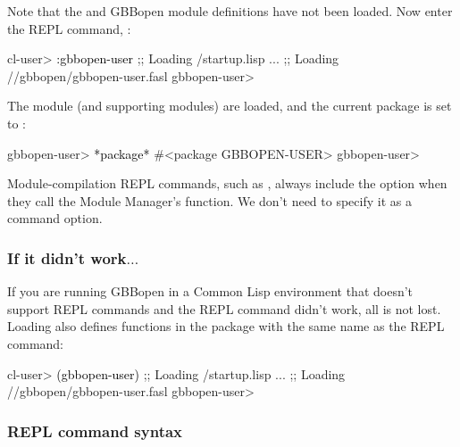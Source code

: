 \documentclass[10pt,twoside,english,pdftex]{article}
\begin{document}
%
%
Note that the  and GBBopen
module definitions have not been loaded.  Now enter the REPL
command, :
%
\W\supp
\begin{example}
\textcolor{darkergray}{%
  cl-user> \textcolor{black}{:gbbopen-user}
  ;; Loading /startup.lisp
     ...
  ;; Loading //gbbopen/gbbopen-user.fasl
  gbbopen-user>}
\end{example}
%
The  module (and supporting modules) are loaded,
and the current package is set to :
%
\W\supp\notpretop
\begin{example}
\textcolor{darkergray}{%
  gbbopen-user> \textcolor{black}{*package*}
  #<package GBBOPEN-USER>
  gbbopen-user>}
\end{example}

Module-compilation REPL commands, such as , always
include the  option when they call the Module
Manager's  function.  We don't need to specify
it as a command option.

\subsubsection*{If it didn't work$\ldots$}

If you are running GBBopen in a Common Lisp environment that doesn't support
REPL commands and the  REPL command didn't work,
all is not lost.  Loading 
also defines functions in the  package with the
same name as the REPL command:
%
\W\supp
\begin{example}
\textcolor{darkergray}{%
  cl-user> \textcolor{black}{(gbbopen-user)}
  ;; Loading /startup.lisp
     ...
  ;; Loading //gbbopen/gbbopen-user.fasl
  gbbopen-user>}
\end{example}

\subsubsection*{REPL command syntax}
\label{sec:REPL-command-syntax}
\end{document}
